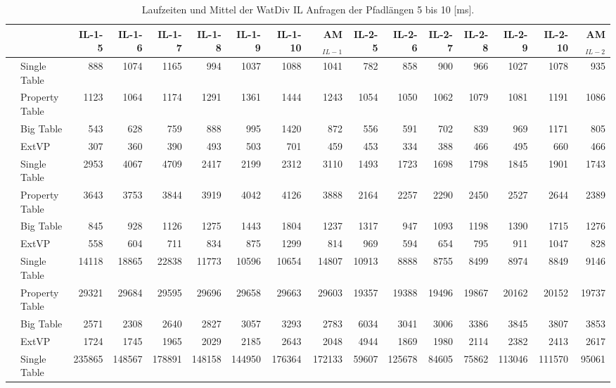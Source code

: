 \documentclass[
  a4paper,
  12pt,
  oneside,
  parskip=half,
  headsepline,
]{scrartcl}
\begin{document}
\setlength{\tabcolsep}{2pt}
\begin{table*}[htb]
	\centering
	\tiny
    \caption{Laufzeiten und Mittel der WatDiv IL Anfragen der Pfadlängen 5 bis 10 [ms].}
  	\label{tab:runtime:watdiv:il}
  	\begin{tabular*}{\textwidth}{ ll @{\extracolsep{\fill}} rrrrrrrrrrrrrr }
		\toprule
		&  & IL-1-5 & IL-1-6 & IL-1-7 & IL-1-8 & IL-1-9 & IL-1-10 & AM$_{IL-1}$ & IL-2-5 & IL-2-6 & IL-2-7 & IL-2-8 & IL-2-9 & IL-2-10 & AM$_{IL-2}$ \\
		\midrule
		\multirow{4}{*}{\rotatebox{90}{SF10}}
		& Single Table & 888 & 1074 & 1165 & 994 & 1037 & 1088 & 1041 & 782 & 858 & 900 & 966 & 1027 & 1078 & 935 \\
		& Property Table & 1123 & 1064 & 1174 & 1291 & 1361 & 1444 & 1243 & 1054 & 1050 & 1062 & 1079 & 1081 & 1191 & 1086 \\
		& Big Table & 543 & 628 & 759 & 888 & 995 & 1420 & 872 & 556 & 591 & 702 & 839 & 969 & 1171 & 805 \\
		& ExtVP & 307 & 360 & 390 & 493 & 503 & 701 & 459 & 453 & 334 & 388 & 466 & 495 & 660 & 466 \\
		\midrule
		\multirow{4}{*}{\rotatebox{90}{SF100}}
		& Single Table & 2953 & 4067 & 4709 & 2417 & 2199 & 2312 & 3110 & 1493 & 1723 & 1698 & 1798 & 1845 & 1901 & 1743 \\
		& Property Table & 3643 & 3753 & 3844 & 3919 & 4042 & 4126 & 3888 & 2164 & 2257 & 2290 & 2450 & 2527 & 2644 & 2389 \\
		& Big Table & 845 & 928 & 1126 & 1275 & 1443 & 1804 & 1237 & 1317 & 947 & 1093 & 1198 & 1390 & 1715 & 1276 \\
		& ExtVP & 558 & 604 & 711 & 834 & 875 & 1299 & 814 & 969 & 594 & 654 & 795 & 911 & 1047 & 828 \\
		\midrule
		\multirow{4}{*}{\rotatebox{90}{SF1000}}
		& Single Table & 14118 & 18865 & 22838 & 11773 & 10596 & 10654 & 14807 & 10913 & 8888 & 8755 & 8499 & 8974 & 8849 & 9146 \\
		& Property Table & 29321 & 29684 & 29595 & 29696 & 29658 & 29663 & 29603 & 19357 & 19388 & 19496 & 19867 & 20162 & 20152 & 19737 \\
		& Big Table & 2571 & 2308 & 2640 & 2827 & 3057 & 3293 & 2783 & 6034 & 3041 & 3006 & 3386 & 3845 & 3807 & 3853 \\
		& ExtVP & 1724 & 1745 & 1965 & 2029 & 2185 & 2643 & 2048 & 4944 & 1869 & 1980 & 2114 & 2382 & 2413 & 2617 \\
		\midrule
		\multirow{7}{*}{\rotatebox{90}{SF10000}}
		& Single Table & 235865 & 148567 & 178891 & 148158 & 144950 & 176364 & 172133 & 59607 & 125678 & 84605 & 75862 & 113046 & 111570 & 95061 \\

\end{tabular*}
\end{table*}
\end{document}
